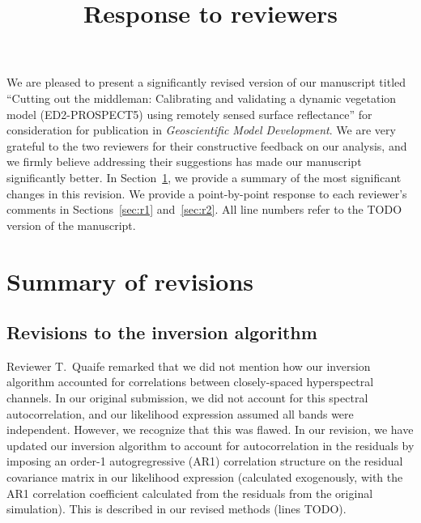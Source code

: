 \documentclass{article}
\title{Response to reviewers}
\author{}
\begin{document}
\maketitle

We are pleased to present a significantly revised version of our manuscript titled
``Cutting out the middleman: Calibrating and validating a dynamic vegetation model (ED2-PROSPECT5) using remotely sensed surface reflectance''
for consideration for publication in \emph{Geoscientific Model Development}.
We are very grateful to the two reviewers for their constructive feedback on our analysis, and we firmly believe addressing their suggestions has made our manuscript significantly better.
In Section~\ref{sec:summary}, we provide a summary of the most significant changes in this revision.
We provide a point-by-point response to each reviewer's comments in Sections~\ref{sec:r1} and~\ref{sec:r2}.
All line numbers refer to the TODO version of the manuscript.

\section{Summary of revisions}\label{sec:summary}

\subsection{Revisions to the inversion algorithm}\label{subsec:algorithm}

Reviewer T.\ Quaife remarked that we did not mention how our inversion algorithm accounted for correlations between closely-spaced hyperspectral channels.
In our original submission, we did not account for this spectral autocorrelation, and our likelihood expression assumed all bands were independent.
However, we recognize that this was flawed.
In our revision, we have updated our inversion algorithm to account for autocorrelation in the residuals by imposing an order-1 autogregressive (AR1) correlation structure on the residual covariance matrix in our likelihood expression (calculated exogenously, with the AR1 correlation coefficient calculated from the residuals from the original simulation).
This is described in our revised methods (lines TODO).
\end{document}

